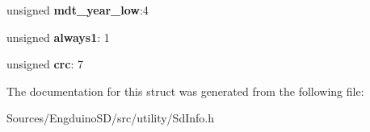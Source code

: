 \begin{DoxyCompactItemize}
\item 
\hypertarget{struct_c_i_d_ac36633e5eef5d901fe999aad7862508b}{}unsigned {\bfseries mdt\+\_\+year\+\_\+low}\+:4\label{struct_c_i_d_ac36633e5eef5d901fe999aad7862508b}

\item 
\hypertarget{struct_c_i_d_af14e08ffbcafb218efae70ad5b8f2c51}{}unsigned {\bfseries always1}\+: 1\label{struct_c_i_d_af14e08ffbcafb218efae70ad5b8f2c51}

\item 
\hypertarget{struct_c_i_d_a69b946a732f93b7a66aff4002ca00b77}{}unsigned {\bfseries crc}\+: 7\label{struct_c_i_d_a69b946a732f93b7a66aff4002ca00b77}

\end{DoxyCompactItemize}


The documentation for this struct was generated from the following file\+:\begin{DoxyCompactItemize}
\item 
Sources/\+Engduino\+S\+D/src/utility/Sd\+Info.\+h\end{DoxyCompactItemize}

